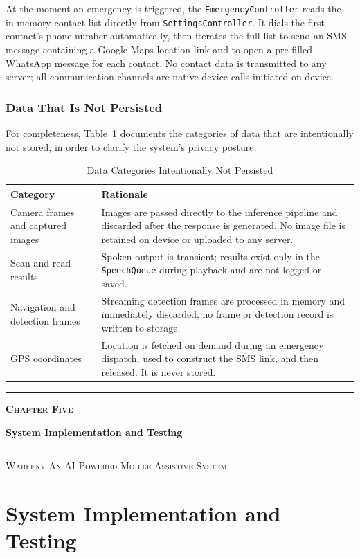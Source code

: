 \documentclass[a4paper]{report}
\newcommand{\chaptercover}[3]{%
  \clearpage
  \thispagestyle{empty}
  \begin{center}
  \vspace*{\fill}
    \makebox[0pt]{\raisebox{-0.30\height}{\textcolor{coverghost}{\fontsize{190}{190}\selectfont\bfseries #1}}}\par
    \vspace{1.9cm}
    {\color{coveraccent}\rule{0.16\textwidth}{3pt}}\par
    \vspace{0.5cm}
    {\Large\bfseries\scshape\color{coveraccent} #2\par}
    \vspace{0.6cm}
    {\fontsize{32}{37}\selectfont\bfseries\color{coverink} #3\par}
    \vspace{0.8cm}
    {\color{coverink!35}\rule{0.55\textwidth}{0.6pt}}\par
  \vspace*{\fill}
    {\footnotesize\scshape\color{coverink!55} Wareeny \quad\textbullet\quad An AI-Powered Mobile Assistive System\par}
    \vspace{0.8cm}
  \end{center}
  \clearpage
}
\begin{document}
At the moment an emergency is triggered, the \texttt{EmergencyController} reads the in-memory contact list directly from \texttt{SettingsController}. It dials the first contact's phone number automatically, then iterates the full list to send an SMS message containing a Google Maps location link and to open a pre-filled WhatsApp message for each contact. No contact data is transmitted to any server; all communication channels are native device calls initiated on-device.

\subsection{Data That Is Not Persisted}
For completeness, Table~\ref{tab:not-persisted} documents the categories of data that are intentionally not stored, in order to clarify the system's privacy posture.

\begin{table}[H]
\centering
\caption{Data Categories Intentionally Not Persisted}
\label{tab:not-persisted}
\begin{tabularx}{\textwidth}{|>{\raggedright\arraybackslash}p{}|>{\raggedright\arraybackslash}X|}
\hline
\textbf{Category} & \textbf{Rationale} \\
\hline
Camera frames and captured images & Images are passed directly to the inference pipeline and discarded after the response is generated. No image file is retained on device or uploaded to any server. \\
\hline
Scan and read results & Spoken output is transient; results exist only in the \texttt{SpeechQueue} during playback and are not logged or saved. \\
\hline
Navigation and detection frames & Streaming detection frames are processed in memory and immediately discarded; no frame or detection record is written to storage. \\
\hline
GPS coordinates & Location is fetched on demand during an emergency dispatch, used to construct the SMS link, and then released. It is never stored. \\
\hline
\end{tabularx}
\end{table}

\chaptercover{5}{Chapter Five}{System Implementation and Testing}
\chapter{System Implementation and Testing}
\end{document}
